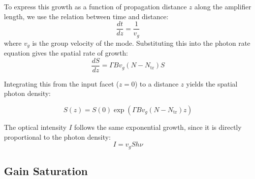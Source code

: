 To express this growth as a function of propagation distance $z$ along the amplifier length, we use the relation between time and distance:
\begin{equation*}
    \frac{dt}{dz} = \frac{1}{v_g}
\end{equation*}
where $v_g$ is the group velocity of the mode.
Substituting this into the photon rate equation gives the spatial rate of growth:
\begin{equation*}
    \frac{dS}{dz} = \Gamma B v_g(N - N_\text{tr})S
\end{equation*}

Integrating this from the input facet ($z = 0$) to a distance $z$ yields the spatial photon density:
\begin{keyresult}
    \begin{equation}
        S(z) = S(0)\exp\!\left(\Gamma B v_g(N - N_\text{tr})z\right)
    \end{equation}
\end{keyresult}
The optical intensity $I$ follows the same exponential growth, since it is directly proportional to the photon density:
\begin{equation*}
    I = v_g S h\nu
\end{equation*}

\subsection{Gain Saturation}

